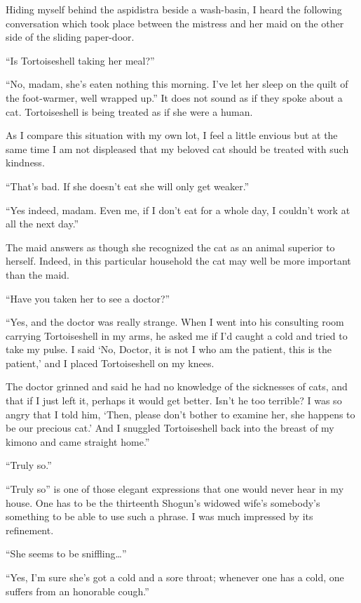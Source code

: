 \documentclass[12pt, openright]{book}
\begin{document}
Hiding myself behind the aspidistra beside a wash-basin, I heard the
following conversation which took place between the mistress and her
maid on the other side of the sliding paper-door.

``Is Tortoiseshell taking her meal?''

``No, madam, she's eaten nothing this morning. I've let her sleep on the
quilt of the foot-warmer, well wrapped up.'' It does not sound as if
they spoke about a cat. Tortoiseshell is being treated as if she were a
human.

As I compare this situation with my own lot, I feel a little envious but
at the same time I am not displeased that my beloved cat should be
treated with such kindness.

``That's bad. If she doesn't eat she will only get weaker.''

``Yes indeed, madam. Even me, if I don't eat for a whole day, I couldn't
work at all the next day.''

The maid answers as though she recognized the cat as an animal superior
to herself. Indeed, in this particular household the cat may well be
more important than the maid.

``Have you taken her to see a doctor?''

``Yes, and the doctor was really strange. When I went into his
consulting room carrying Tortoiseshell in my arms, he asked me if I'd
caught a cold and tried to take my pulse. I said `No, Doctor, it is not
I who am the patient, this is the patient,' and I placed Tortoiseshell
on my knees.

The doctor grinned and said he had no knowledge of the sicknesses of
cats, and that if I just left it, perhaps it would get better. Isn't he
too terrible? I was so angry that I told him, `Then, please don't bother
to examine her, she happens to be our precious cat.' And I snuggled
Tortoiseshell back into the breast of my kimono and came straight
home.''

``Truly so.''

``Truly so'' is one of those elegant expressions that one would never
hear in my house. One has to be the thirteenth Shogun's widowed wife's
somebody's something to be able to use such a phrase. I was much
impressed by its refinement.

``She seems to be sniffling\ldots{}''

``Yes, I'm sure she's got a cold and a sore throat; whenever one has a
cold, one suffers from an honorable cough.''
\end{document}
